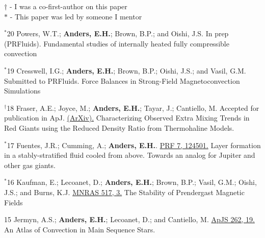 {}
\hspace{\smallsephintwidth}$\dagger$ - I was a co-first-author on this paper \\
\hspace{\smallsephintwidth}$*$ - This paper was led by someone I mentor
\vspace{0.3cm}



      {$^*$20}
      {
        Powers, W.T.; \textbf{Anders, E.H.}; Brown, B.P.; and Oishi, J.S.
        In prep (PRFluids).\hspace{-0.5cm}
      }
      {Fundamental studies of internally heated fully compressible convection}

\cvpub{}
      {$^*$19}
      {
        Cresswell, I.G.; \textbf{Anders, E.H.}; Brown, B.P.; Oishi, J.S.; and Vasil, G.M.
        Submitted to PRFluids. 
      }
      {Force Balances in Strong-Field Magnetoconvection Simulations}


\cvpub{}
      {$^\dagger$18}
      {
        Fraser, A.E.; Joyce, M.; \textbf{Anders, E.H.}; Tayar, J.; Cantiello, M. Accepted for publication in ApJ.
        \href{https://arxiv.org/abs/2204.08487}{(ArXiv).}
      }
      {Characterizing Observed Extra Mixing Trends in Red Giants using the Reduced Density Ratio from Thermohaline Models.}

\cvpub{}
      {$^*$17}
      {
        Fuentes, J.R.; Cumming, A.; \textbf{Anders, E.H.}.
        \href{https://journals.aps.org/prfluids/abstract/10.1103/PhysRevFluids.7.124501}{PRF 7, 124501.}
      }
      {Layer formation in a stably-stratified fluid cooled from above. Towards an analog for Jupiter and other gas giants.}


\cvpub{}
      {$^*$16}
      {
        Kaufman, E.; Lecoanet, D.; \textbf{Anders, E.H.}; Brown, B.P.; Vasil, G.M.; Oishi, J.S.; and Burns, K.J.
        \href{https://academic.oup.com/mnras/article/517/3/3332/6748231?login=true}{MNRAS 517, 3.}
      }
      {The Stability of Prendergast Magnetic Fields}

\cvpub{}
	  {15}
	  {
		Jermyn, A.S.; \textbf{Anders, E.H.}; Lecoanet, D.; and Cantiello, M.
        \href{https://iopscience.iop.org/article/10.3847/1538-4365/ac7cee}{ApJS 262, 19.}
       }
	  {An Atlas of Convection in Main Sequence Stars.}


